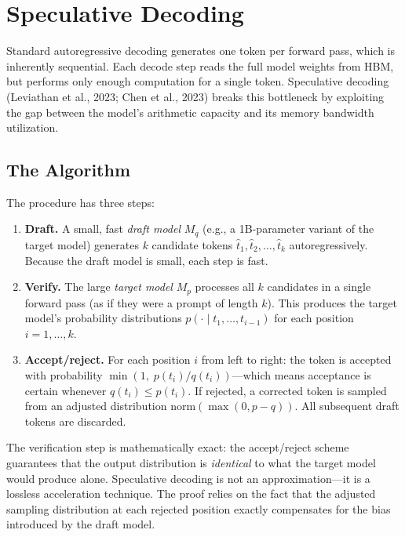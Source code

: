 \section{Speculative Decoding}
\label{sec:distributed:speculative}

%
Standard autoregressive decoding generates one token per forward pass, which is inherently sequential. Each decode step reads the full model weights from HBM, but performs only enough computation for a single token. Speculative decoding (Leviathan et al., 2023; Chen et al., 2023) breaks this bottleneck by exploiting the gap between the model's arithmetic capacity and its memory bandwidth utilization.

\subsection{The Algorithm}

The procedure has three steps:

\begin{enumerate}
\item \textbf{Draft.} A small, fast \emph{draft model} $M_q$ (e.g., a 1B-parameter variant of the target model) generates $k$ candidate tokens $\hat{t}_1, \hat{t}_2, \ldots, \hat{t}_k$ autoregressively. Because the draft model is small, each step is fast.
\item \textbf{Verify.} The large \emph{target model} $M_p$ processes all $k$ candidates in a single forward pass (as if they were a prompt of length $k$). This produces the target model's probability distributions $p(\cdot \mid t_1, \ldots, t_{i-1})$ for each position $i = 1, \ldots, k$.
\item \textbf{Accept/reject.} For each position $i$ from left to right: the token is accepted with probability $\min(1,\; p(t_i)/q(t_i))$---which means acceptance is certain whenever $q(t_i) \leq p(t_i)$. If rejected, a corrected token is sampled from an adjusted distribution $\text{norm}(\max(0, p - q))$. All subsequent draft tokens are discarded.
\end{enumerate}

\begin{insightbox}
The verification step is mathematically exact: the accept/reject scheme guarantees that the output distribution is \emph{identical} to what the target model would produce alone. Speculative decoding is not an approximation---it is a lossless acceleration technique. The proof relies on the fact that the adjusted sampling distribution at each rejected position exactly compensates for the bias introduced by the draft model.
\end{insightbox}

